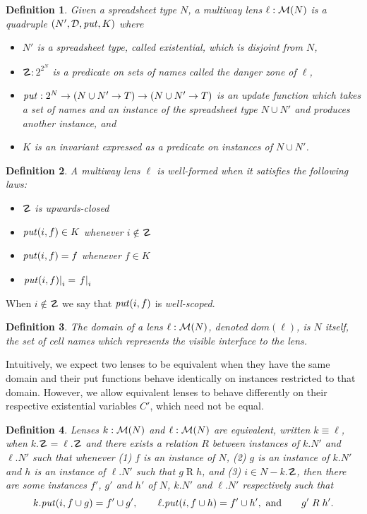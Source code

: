 \documentclass{article}
\newtheorem{definition}{Definition}
\begin{document}
\begin{definition}
    Given a spreadsheet type $N$, a \emph{multiway lens} $\ell : \mathcal M(N)$
    is a quadruple $(N',\mathcal D,\mathit{put},K)$ where
    \begin{itemize}
        \item $N'$ is a spreadsheet type, called \emph{existential}, which is disjoint from $N$,
        \item $\danger : 2^{2^N}$ is a predicate on sets of names called the \emph{danger
            zone} of $\ell$,
        \item $\mathit{put} : 2^N \to (N \cup N' \to T) \to (N \cup N' \to T)$ is
            an update function which takes a set of names and an instance of
            the spreadsheet type $N \cup N'$ and produces another instance,
            and
        \item $K$ is an invariant expressed as a predicate on instances of
            $N \cup N'$.
    \end{itemize}
\end{definition}

\begin{definition}
    A multiway lens $\ell$ is \emph{well-formed} when it satisfies the
    following laws:
    \begin{itemize}
        \item $\danger$ is upwards-closed
        \item $\mathit{put}(i,f) \in K$ whenever $i \notin \danger$
        \item $\mathit{put}(i,f) = f$ whenever $f \in K$
        \item $\left.\mathit{put}(i,f)\right|_i = \left.f\right|_i$
    \end{itemize}
\end{definition}
When $i \notin \danger$ we say that $\mathit{put}(i,f)$ is \emph{well-scoped}.

\newcommand{\mdomain}[1]{\mathit{dom}(#1)}
\begin{definition}
    The \emph{domain} of a lens $\ell : \mathcal M(N)$, denoted $\mdomain\ell$, is
    $N$ itself, the set of cell names which represents the visible
    interface to the lens.
\end{definition}

Intuitively, we expect two lenses to be equivalent when they have the
same domain and their put functions behave identically on instances
restricted to that domain. However, we allow equivalent lenses to 
behave differently on their respective existential variables $C'$,
which need not be equal. 
\begin{definition}
    Lenses $k : \mathcal M(N)$ and $\ell : \mathcal M(N)$ are \emph{equivalent},
    written $k \equiv \ell$, when $k.\danger = \ell.\danger$ and there
    exists a relation $R$ between instances of $k.N'$ and $\ell.N'$ such
    that whenever (1) $f$ is an instance of $N$, (2) $g$ is an instance of $k.N'$
    and $h$ is an instance of $\ell.N'$ such that $g \mathrel R h$,
    and (3) $i\in N - k.\danger$, then there are some instances $f'$, $g'$ and
    $h'$ of $N$, $k.N'$ and $\ell.N'$ respectively such that
    \[k.\mathit{put}(i,f\cup g) = f' \cup g', \qquad
      \ell.\mathit{put}(i,f\cup h) = f' \cup h', \text{ and} \qquad
      g' \mathrel R h'. \]
\end{definition}
\end{document}
